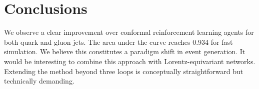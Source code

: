 \section{Conclusions}\label{sec:conclusions}

We observe a clear improvement over conformal reinforcement learning
agents for both quark and gluon jets. The area under the curve reaches
0.934 for fast simulation. We believe this constitutes a paradigm shift
in event generation. It would be interesting to combine this approach
with Lorentz-equivariant networks. Extending the method beyond three
loops is conceptually straightforward but technically demanding.

